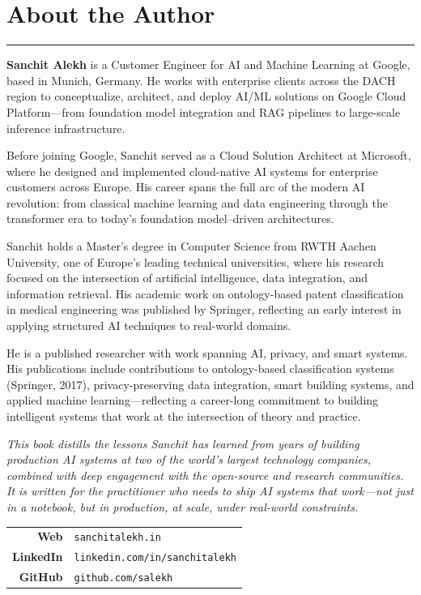 \chapter*{About the Author}

\begin{center}
{\color{oreillyteal}\rule{0.3\textwidth}{2pt}}
\end{center}

\vspace{1em}

\noindent\textbf{Sanchit Alekh} is a Customer Engineer for AI and Machine Learning at Google, based in Munich, Germany. He works with enterprise clients across the DACH region to conceptualize, architect, and deploy AI/ML solutions on Google Cloud Platform---from foundation model integration and RAG pipelines to large-scale inference infrastructure.

Before joining Google, Sanchit served as a Cloud Solution Architect at Microsoft, where he designed and implemented cloud-native AI systems for enterprise customers across Europe. His career spans the full arc of the modern AI revolution: from classical machine learning and data engineering through the transformer era to today's foundation model--driven architectures.

Sanchit holds a Master's degree in Computer Science from RWTH Aachen University, one of Europe's leading technical universities, where his research focused on the intersection of artificial intelligence, data integration, and information retrieval. His academic work on ontology-based patent classification in medical engineering was published by Springer, reflecting an early interest in applying structured AI techniques to real-world domains.

He is a published researcher with work spanning AI, privacy, and smart systems. His publications include contributions to ontology-based classification systems (Springer, 2017), privacy-preserving data integration, smart building systems, and applied machine learning---reflecting a career-long commitment to building intelligent systems that work at the intersection of theory and practice.

\vspace{1em}

\noindent\textit{This book distills the lessons Sanchit has learned from years of building production AI systems at two of the world's largest technology companies, combined with deep engagement with the open-source and research communities. It is written for the practitioner who needs to ship AI systems that work---not just in a notebook, but in production, at scale, under real-world constraints.}

\vspace{2em}

\begin{center}
{\small\sffamily
\begin{tabular}{rl}
\textbf{Web} & \texttt{sanchitalekh.in} \\[0.3em]
\textbf{LinkedIn} & \texttt{linkedin.com/in/sanchitalekh} \\[0.3em]
\textbf{GitHub} & \texttt{github.com/salekh} \\
\end{tabular}
}
\end{center}
